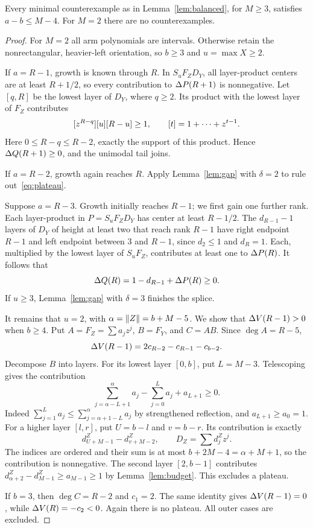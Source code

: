\begin{proposition}\label{prop:outer}
Every minimal counterexample as in Lemma~\ref{lem:balanced}, for $M\ge3$, satisfies $a-b\le M-4$. For $M=2$ there are no counterexamples.
\end{proposition}
\begin{proof}
For $M=2$ all arm polynomials are intervals. Otherwise retain the nonrectangular, heavier-left orientation, so $b\ge3$ and $u=\max X\ge2$.

If $a=R-1$, growth is known through $R$. In $S_uF_ZD_Y$, all layer-product centers are at least $R+1/2$, so every contribution to $\Delta P(R+1)$ is nonnegative. Let $[q,R]$ be the lowest layer of $D_Y$, where $q\ge2$. Its product with the lowest layer of $F_Z$ contributes
\[
 [z^{R-q}][u][R-u]\ge1,
 \qquad [t]=1+\cdots+z^{t-1}.
\]
Here $0\le R-q\le R-2$, exactly the support of this product. Hence $\Delta Q(R+1)\ge0$, and the unimodal tail joins.

If $a=R-2$, growth again reaches $R$. Apply Lemma~\ref{lem:gap} with $\delta=2$ to rule out~\eqref{eq:plateau}.

Suppose $a=R-3$. Growth initially reaches $R-1$; we first gain one further rank. Each layer-product in $P=S_uF_ZD_Y$ has center at least $R-1/2$. The $d_{R-1}-1$ layers of $D_Y$ of height at least two that reach rank $R-1$ have right endpoint $R-1$ and left endpoint between $3$ and $R-1$, since $d_2\le1$ and $d_R=1$. Each, multiplied by the lowest layer of $S_uF_Z$, contributes at least one to $\Delta P(R)$. It follows that
\[
 \Delta Q(R)=1-d_{R-1}+\Delta P(R)\ge0.
\]
If $u\ge3$, Lemma~\ref{lem:gap} with $\delta=3$ finishes the splice.

It remains that $u=2$, with $\alpha=\lVert Z\rVert=b+M-5$. We show that $\Delta V(R-1)>0$ when $b\ge4$. Put $A=F_Z=\sum a_jz^j$, $B=F_Y$, and $C=AB$. Since $\deg A=R-5$,
\[
 \Delta V(R-1)=2c_{R-2}-c_{R-1}-c_{b-2}.
\]
Decompose $B$ into layers. For its lowest layer $[0,b]$, put $L=M-3$. Telescoping gives the contribution
\[
 \sum_{j=\alpha-L+1}^{\alpha}a_j-\sum_{j=0}^{L}a_j+a_{L+1}\ge0.
\]
Indeed $\sum_{j=1}^La_j\le\sum_{j=\alpha+1-L}^{\alpha}a_j$ by strengthened reflection, and $a_{L+1}\ge a_0=1$. For a higher layer $[l,r]$, put $U=b-l$ and $v=b-r$. Its contribution is exactly
\[
 d^Z_{U+M-1}-d^Z_{v+M-2},\qquad D_Z=\sum d^Z_jz^j.
\]
The indices are ordered and their sum is at most $b+2M-4=\alpha+M+1$, so the contribution is nonnegative. The second layer $[2,b-1]$ contributes $d^Z_{\alpha+2}-d^Z_{M-1}\ge a_{M-1}\ge1$ by Lemma~\ref{lem:budget}. This excludes a plateau.

If $b=3$, then $\deg C=R-2$ and $c_1=2$. The same identity gives $\Delta V(R-1)=0$, while $\Delta V(R)=-c_2<0$. Again there is no plateau. All outer cases are excluded.
\end{proof}


